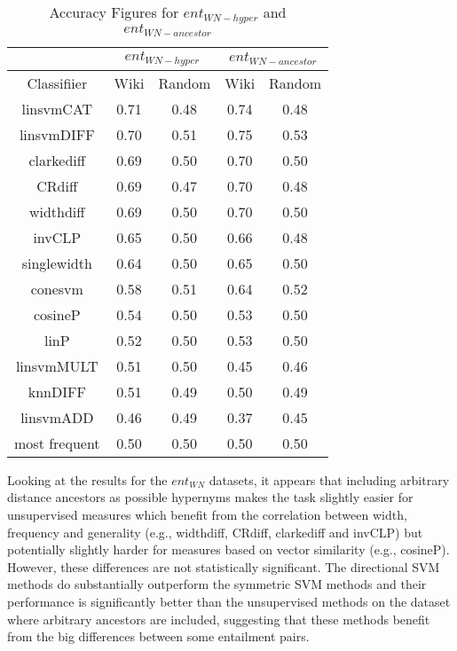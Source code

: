 \documentclass[11pt]{article}
\begin{document}


\begin{table*}[ht]
\centering
\begin{tabular}{|c|c|c|c|c|}
\hline
&\multicolumn{2}{|c|}{$ent_{WN-hyper}$}&\multicolumn{2}{|c|}{$ent_{WN-ancestor}$}\\
\hline
Classifiier&Wiki&Random&Wiki&Random\\
\hline
linsvmCAT&0.71&0.48&0.74&0.48\\
linsvmDIFF&0.70&0.51&0.75&0.53\\
clarkediff&0.69&0.50&0.70&0.50\\
CRdiff&0.69&0.47&0.70&0.48\\
widthdiff&0.69&0.50&0.70&0.50\\
invCLP&0.65&0.50&0.66&0.48\\
singlewidth&0.64&0.50&0.65&0.50\\
conesvm&0.58&0.51&0.64&0.52\\
cosineP&0.54&0.50&0.53&0.50\\
linP&0.52&0.50&0.53&0.50\\
linsvmMULT&0.51&0.50&0.45&0.46\\
knnDIFF&0.51&0.49&0.50&0.49\\
linsvmADD&0.46&0.49&0.37&0.45\\
most frequent&0.50&0.50&0.50&0.50\\
\hline
\end{tabular}
\caption{Accuracy Figures for $ent_{WN-hyper}$ and $ent_{WN-ancestor}$}
\label{table:results_ent_WN}
\end{table*}

Looking at the results for the $ent_{WN}$ datasets, it appears that including arbitrary distance ancestors as possible hypernyms makes the task slightly easier for unsupervised measures which benefit from the correlation between width, frequency and generality (e.g., widthdiff, CRdiff, clarkediff and invCLP) but potentially slightly harder for measures based on vector similarity (e.g., cosineP).  However, these differences are not statistically significant.  The directional SVM methods do substantially outperform the symmetric SVM methods and their performance is significantly better than the unsupervised methods on the dataset where arbitrary ancestors are included, suggesting that these methods benefit from the big differences between some entailment pairs.
\end{document}
